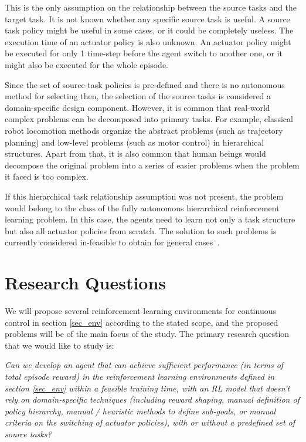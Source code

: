 This is the only assumption on the relationship between the source tasks and the target task. It is not known whether any specific source task is useful. A source task policy might be useful in some cases, or it could be completely useless. The execution time of an actuator policy is also unknown. An actuator policy might be executed for only 1 time-step before the agent switch to another one, or it might also be executed for the whole episode.

Since the set of source-task policies is pre-defined and there is no autonomous method for selecting then, the selection of the source tasks is considered a domain-specific design component. However, it is common that real-world complex problems can be decomposed into primary tasks. For example, classical robot locomotion methods organize the abstract problems (such as trajectory planning) and low-level problems (such as motor control) in hierarchical structures. Apart from that, it is also common that human beings would decompose the original problem into a series of easier problems when the problem it faced is too complex.

If this hierarchical task relationship assumption was not present, the problem would belong to the class of the fully autonomous hierarchical reinforcement learning problem. In this case, the agents need to learn not only a task structure but also all actuator policies from scratch. The solution to such problems is currently considered in-feasible to obtain for general cases~\cite{barto2003recent}.


\section{Research Questions}


We will propose several reinforcement learning environments for continuous control in section \ref{sec_env} according to the stated scope, and the proposed problems will be of the main focus of the study.
The primary research question that we would like to study is:

    \textit{Can we develop an agent that can achieve sufficient performance (in terms of total episode reward) in the reinforcement learning environments defined in section \ref{sec_env} within a feasible training time, with an RL model that doesn't rely on domain-specific techniques  (including reward shaping, manual definition of policy hierarchy, manual / heuristic methods to define sub-goals, or manual criteria on the switching of actuator policies), with or without a predefined set of source tasks?}


